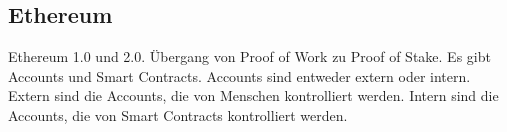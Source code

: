 \subsection{Ethereum}
Ethereum 1.0 und 2.0. Übergang von Proof of Work zu Proof of Stake.
Es gibt Accounts und Smart Contracts. Accounts sind entweder extern oder intern.
Extern sind die Accounts, die von Menschen kontrolliert werden. Intern sind die Accounts,
die von Smart Contracts kontrolliert werden. 